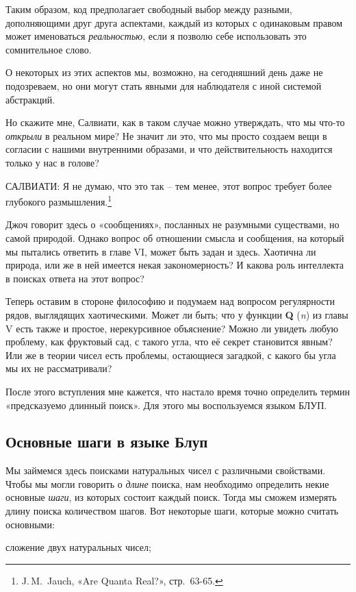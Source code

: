 \documentclass[../main.tex]{subfiles}
\begin{document}
Таким образом, код предполагает свободный выбор между разными, дополняющими друг друга аспектами, каждый из которых с одинаковым правом может именоваться \emph{реальностью}, если я позволю себе использовать это сомнительное слово.

О некоторых из этих аспектов мы, возможно, на сегодняшний день даже не подозреваем, но они могут стать явными для наблюдателя с иной системой абстракций.

Но скажите мне, Салвиати, как в таком случае можно утверждать, что мы что-то \emph{открыли} в реальном мире? Не значит ли это, что мы просто создаем вещи в согласии с нашими внутренними образами, и что действительность находится только у нас в голове?

САЛВИАТИ: Я не думаю, что это так \--- тем менее, этот вопрос требует более глубокого размышления.\footnote{J.\,M.~Jauch, «Are Quanta Real?», стр.~63-65.}

Джоч говорит здесь о «сообщениях», посланных не разумными существами, но самой природой. Однако вопрос об отношении смысла и сообщения, на который мы пытались ответить в главе VI, может быть задан и здесь. Хаотична ли природа, или же в ней имеется некая закономерность? И какова роль интеллекта в поисках ответа на этот вопрос?

Теперь оставим в стороне философию и подумаем над вопросом регулярности рядов, выглядящих хаотическими. Может ли быть; что у функции \textbf{Q} (\emph{n}) из главы V есть также и простое, нерекурсивное объяснение? Можно ли увидеть любую проблему, как фруктовый сад, с такого угла, что её секрет становится явным? Или же в теории чисел есть проблемы, остающиеся загадкой, с какого бы угла мы их не рассматривали?

После этого вступления мне кажется, что настало время точно определить термин «предсказуемо длинный поиск». Для этого мы воспользуемся языком БЛУП.


\subsection{Основные шаги в языке Блуп}

Мы займемся здесь поисками натуральных чисел с различными свойствами. Чтобы мы могли говорить о \emph{длине} поиска, нам необходимо определить некие основные \emph{шаги}, из которых состоит каждый поиск. Тогда мы сможем измерять длину поиска количеством шагов. Вот некоторые шаги, которые можно считать основными:

сложение двух натуральных чисел;
\end{document}

